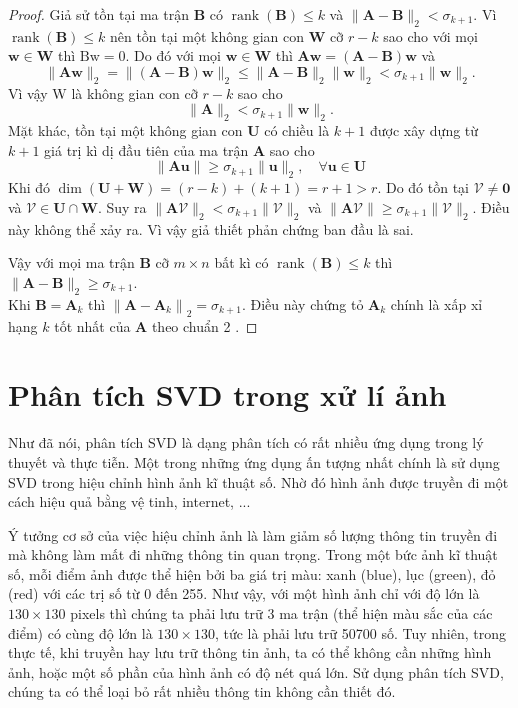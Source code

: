 \documentclass[12pt,a4paper,oneside]{report}
\numberwithin{equation}{section}
\begin{document}
\begin{proof}
Giả sử tồn tại ma trận $\mathbf{B}$ có $\operatorname{rank}(\mathbf{B}) \leqslant k$ và $\|\mathbf{A}-\mathbf{B}\|_{2}<\sigma_{k+1}$. Vì $\operatorname{rank}(\mathbf{B}) \leqslant k$ nên tồn tại một không gian con $\mathbf{W}$ cỡ $r-k$ sao cho với mọi $\mathbf{w} \in \mathbf{W}$ thì $\mathrm{Bw}=0$.
Do đó với mọi $\mathbf{w} \in \mathbf{W}$ thì $\mathbf{A} \mathbf{w}=(\mathbf{A}-\mathbf{B}) \mathbf{w}$ và
$$
\|\mathbf{A} \mathbf{w}\|_{2}=\|(\mathbf{A}-\mathbf{B}) \mathbf{w}\|_{2} \leqslant\|\mathbf{A}-\mathbf{B}\|_{2}\|\mathbf{w}\|_{2}<\sigma_{k+1}\|\mathbf{w}\|_{2} .
$$
Vì vậy W là không gian con cỡ $r-k$ sao cho
$$
\|\mathbf{A}\|_{2}<\sigma_{k+1}\|\mathbf{w}\|_{2} .
$$
Mặt khác, tồn tại một không gian con $\mathbf{U}$ có chiều là $k+1$ được xây dựng từ $k+1$ giá trị kì dị đầu tiên của ma trận $\mathbf{A}$ sao cho
$$
\|\mathbf{A} \mathbf{u}\| \geqslant \sigma_{k+1}\|\mathbf{u}\|_{2}, \quad \forall \mathbf{u} \in \mathbf{U}
$$
Khi đó $\operatorname{dim}(\mathbf{U}+\mathbf{W})=(r-k)+(k+1)=r+1>r$. Do đó tồn tại $\mathcal{V} \neq \mathbf{0}$ và $\mathcal{V} \in \mathbf{U} \cap \mathbf{W}$. Suy ra $\|\mathbf{A} \mathcal{V}\|_{2}<\sigma_{k+1}\|\mathcal{V}\|_{2}$ và $\|\mathbf{A} \mathcal{V}\| \geqslant \sigma_{k+1}\|\mathcal{V}\|_{2}$. Điều này không thể xảy ra. Vì vậy giả thiết phản chứng ban đầu là sai.

Vậy với mọi ma trận $\mathbf{B}$ cỡ $m \times n$ bất kì có $\operatorname{rank}(\mathbf{B}) \leqslant k$ thì $\|\mathbf{A}-\mathbf{B}\|_{2} \geqslant \sigma_{k+1}$.\\
Khi $\mathbf{B}=\mathbf{A}_{k}$ thì $\left\|\mathbf{A}-\mathbf{A}_{k}\right\|_{2}=\sigma_{k+1}$. Điều này chứng tỏ $\mathbf{A}_{k}$ chính là xấp xỉ hạng $k$ tốt nhất của $\mathbf{A}$ theo chuẩn 2 . 
\end{proof}

\section{Phân tích SVD trong xử lí ảnh}

Như đã nói, phân tích SVD là dạng phân tích có rất nhiều ứng dụng trong lý thuyết và thực tiễn. Một trong những ứng dụng ấn tượng nhất chính là sử dụng SVD trong hiệu chỉnh hình ảnh kĩ thuật số. Nhờ đó hình ảnh được truyền đi một cách hiệu quả bằng vệ tinh, internet, ...

Ý tưởng cơ sở của việc hiệu chỉnh ảnh là làm giảm số lượng thông tin truyền đi mà không làm mất đi những thông tin quan trọng. Trong một bức ảnh kĩ thuật số, mỗi điểm ảnh được thể hiện bởi ba giá trị màu: xanh (blue), lục (green), đỏ (red) với các trị số từ 0 đến 255. Như vậy, với một hình ảnh chỉ với độ lớn là $130 \times 130$ pixels thì chúng ta phải lưu trữ 3 ma trận (thể hiện màu sắc của các điểm) có cùng độ lớn là $130 \times 130$, tức là phải lưu trữ 50700 số. Tuy nhiên, trong thực tế, khi truyền hay lưu trữ thông tin ảnh, ta có thể không cần những hình ảnh, hoặc một số phần của hình ảnh có độ nét quá lớn. Sử dụng phân tích SVD, chúng ta có thể loại bỏ rất nhiều thông tin không cần thiết đó.
\end{document}
